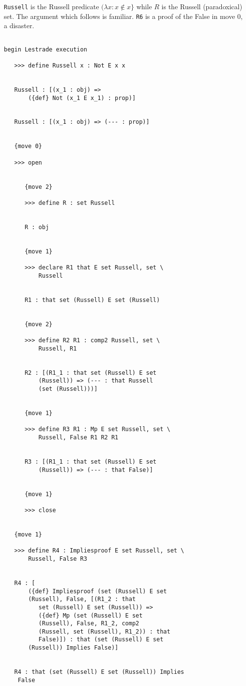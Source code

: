 \documentclass[12pt]{article}
\begin{document}
{\tt Russell} is the Russell predicate $(\lambda x:x \not\in x\}$ while $R$ is the Russell (paradoxical) set.  The argument which follows
is familiar.  {\tt R6} is a proof of the False in move 0, a disaster.

\begin{verbatim}

begin Lestrade execution

   >>> define Russell x : Not E x x


   Russell : [(x_1 : obj) => 
       ({def} Not (x_1 E x_1) : prop)]


   Russell : [(x_1 : obj) => (--- : prop)]


   {move 0}

   >>> open


      {move 2}

      >>> define R : set Russell


      R : obj


      {move 1}

      >>> declare R1 that E set Russell, set \
          Russell


      R1 : that set (Russell) E set (Russell)


      {move 2}

      >>> define R2 R1 : comp2 Russell, set \
          Russell, R1


      R2 : [(R1_1 : that set (Russell) E set 
          (Russell)) => (--- : that Russell 
          (set (Russell)))]


      {move 1}

      >>> define R3 R1 : Mp E set Russell, set \
          Russell, False R1 R2 R1


      R3 : [(R1_1 : that set (Russell) E set 
          (Russell)) => (--- : that False)]


      {move 1}

      >>> close


   {move 1}

   >>> define R4 : Impliesproof E set Russell, set \
       Russell, False R3


   R4 : [
       ({def} Impliesproof (set (Russell) E set 
       (Russell), False, [(R1_2 : that 
          set (Russell) E set (Russell)) => 
          ({def} Mp (set (Russell) E set 
          (Russell), False, R1_2, comp2 
          (Russell, set (Russell), R1_2)) : that 
          False)]) : that (set (Russell) E set 
       (Russell)) Implies False)]


   R4 : that (set (Russell) E set (Russell)) Implies 
    False



\end{verbatim}
\end{document}
